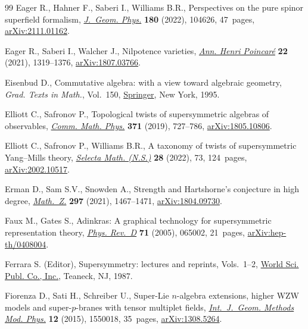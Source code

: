 \begin{thebibliography}{99}
Eager R., Hahner F., Saberi I., Williams B.R., Perspectives on the pure spinor
 superfield formalism, \href{https://doi.org/10.1016/j.geomphys.2022.104626}{\textit{J.~Geom. Phys.}} \textbf{180} (2022), 104626,
 47~pages, \href{https://arxiv.org/abs/2111.01162}{arXiv:2111.01162}.

Eager R., Saberi I., Walcher J., Nilpotence varieties, \href{https://doi.org/10.1007/s00023-020-01007-y}{\textit{Ann. Henri
 Poincar\'e}} \textbf{22} (2021), 1319--1376, \href{https://arxiv.org/abs/1807.03766}{arXiv:1807.03766}.

Eisenbud D., Commutative algebra: with a view toward algebraic geometry,
 \textit{Grad. Texts in Math.}, Vol.~150, \href{https://doi.org/10.1007/978-1-4612-5350-1}{Springer}, New York, 1995.

Elliott C., Safronov P., Topological twists of supersymmetric algebras of
 observables, \href{https://doi.org/10.1007/s00220-019-03393-9}{\textit{Comm. Math. Phys.}} \textbf{371} (2019), 727--786,
 \href{https://arxiv.org/abs/1805.10806}{arXiv:1805.10806}.

Elliott C., Safronov P., Williams B.R., A taxonomy of twists of supersymmetric
 {Y}ang--{M}ills theory, \href{https://doi.org/10.1007/s00029-022-00786-y}{\textit{Selecta Math. (N.S.)}} \textbf{28} (2022), 73,
 124~pages, \href{https://arxiv.org/abs/2002.10517}{arXiv:2002.10517}.

Erman D., Sam S.V., Snowden A., Strength and {H}artshorne's conjecture in high
 degree, \href{https://doi.org/10.1007/s00209-020-02564-y}{\textit{Math.~Z.}} \textbf{297} (2021), 1467--1471,
 \href{https://arxiv.org/abs/1804.09730}{arXiv:1804.09730}.

Faux M., Gates S., Adinkras: A graphical technology for supersymmetric
 representation theory, \href{https://link.aps.org/doi/10.1103/PhysRevD.71.065002}{\textit{Phys. Rev.~D}} \textbf{71} (2005), 065002,
 21~pages, \href{https://arxiv.org/abs/hep-th/0408004}{arXiv:hep-th/0408004}.

Ferrara S. (Editor), Supersymmetry: lectures and reprints, Vols.~1--2, \href{https://doi.org/10.1142/0091}{World
 Sci. Publ. Co., Inc.}, Teaneck, NJ, 1987.

Fiorenza D., Sati H., Schreiber U., Super-{L}ie {$n$}-algebra extensions,
 higher {WZW} models and super-{$p$}-branes with tensor multiplet fields,
 \href{https://doi.org/10.1142/S0219887815500188}{\textit{Int.~J.~Geom. Methods Mod. Phys.}} \textbf{12} (2015), 1550018,
 35~pages, \href{https://arxiv.org/abs/1308.5264}{arXiv:1308.5264}.


\end{thebibliography}
